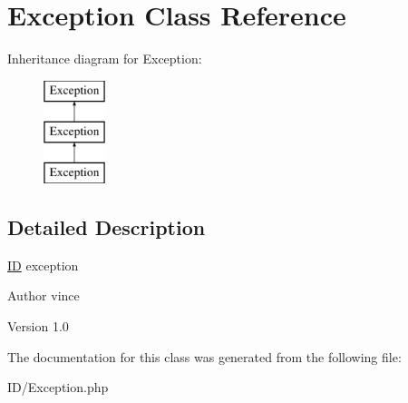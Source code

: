 \hypertarget{class_anemo_1_1_i_d_1_1_exception}{
\section{Exception Class Reference}
\label{class_anemo_1_1_i_d_1_1_exception}
}
Inheritance diagram for Exception:\begin{figure}[H]
\begin{center}
\leavevmode
\includegraphics[height=3.000000cm]{class_anemo_1_1_i_d_1_1_exception}
\end{center}
\end{figure}


\subsection{Detailed Description}
\hyperlink{class_anemo_1_1_i_d}{ID} exception \begin{DoxyAuthor}{Author}
vince 
\end{DoxyAuthor}
\begin{DoxyVersion}{Version}
1.0 
\end{DoxyVersion}


The documentation for this class was generated from the following file:\begin{DoxyCompactItemize}
\item 
ID/Exception.php\end{DoxyCompactItemize}
